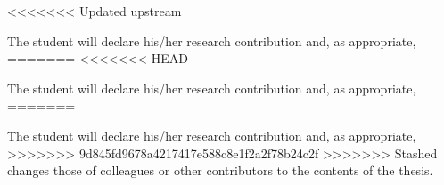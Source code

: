 <<<<<<< Updated upstream

The student will declare his/her research contribution and, as appropriate, 
=======
<<<<<<< HEAD

The student will declare his/her research contribution and, as appropriate, 
=======

The student will declare his/her research contribution and, as appropriate, 
>>>>>>> 9d845fd9678a4217417e588c8e1f2a2f78b24c2f
>>>>>>> Stashed changes
those of colleagues or other contributors to the contents of the thesis. 